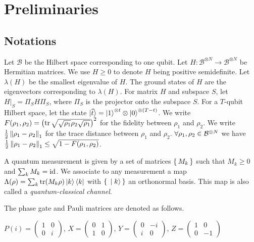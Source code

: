 \section{Preliminaries}

\subsection{Notations}

Let $\mathcal{B}$ be the Hilbert space corresponding to one qubit. Let $H:\mathcal{B}^{\otimes N}\rightarrow\mathcal{B}^{\otimes N}$ be Hermitian matrices. We use $H\geq0$ to denote $H$ being positive semidefinite. Let $\lambda(H)$ be the smallest eigenvalue of $H$. The ground states of $H$ are the eigenvectors corresponding to $\lambda(H)$. For matrix $H$ and subspace $S$, let $H\big|_S=\Pi_S H \Pi_S$, where $\Pi_S$ is the projector onto the subspace $S$. For a $T$-qubit Hilbert space, let the state $\ket{\widehat{t}}=\ket{1}^{\otimes t}\otimes \ket{0}^{{\otimes (T-t)}}$.
We write $F(\rho_1, \rho_2)=\left(\operatorname{tr}\sqrt{\sqrt{\rho_1}\rho_2\sqrt{\rho_1}}\right)^2$ for the fidelity between $\rho_1$ and $\rho_2$.
We write $\frac{1}{2}\left\lVert\rho_1-\rho_2\right\rVert_1$ for the trace distance between $\rho_1$ and $\rho_2$. $\forall \rho_1, \rho_2\in\mathcal{B}^{\otimes N}$ we have $\frac{1}{2}\left\lVert\rho_1-\rho_2\right\rVert_1\leq\sqrt{1-F(\rho_1, \rho_2)}$.

\begin{definition} 
	\label{def:QCChannel}
	A quantum measurement is given by a set of matrices $\set{M_k}$ such that $M_k\geq0$ and $\sum_k M_k=\operatorname{id}$.
	We associate to any measurement a map $\Lambda(\rho)=\sum_k \operatorname{tr}(M_k\rho)\ket{k}\bra{k}$
	with $\set{\ket{k}}$ an orthonormal basis.
	This map is also called a \emph{quantum-classical channel}.
\end{definition}

The phase gate and Pauli matrices are denoted as follows.

\begin{definition}
	$P(i)=\begin{pmatrix}1&0\\0&i\end{pmatrix}$, $X=\begin{pmatrix}0&1\\1&0\end{pmatrix}$,
	$Y=\begin{pmatrix}0&-i\\i&0\end{pmatrix}$,
	$Z=\begin{pmatrix}1&0\\0&-1\end{pmatrix}$
\end{definition}

